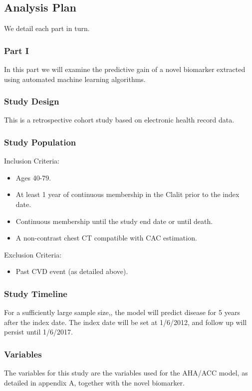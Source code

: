 \documentclass[a4paper,12pt]{article}
\begin{document}
	\subsection{Analysis Plan}
	We detail each part in turn.
	
		\subsubsection{Part I}
		In this part we will examine the predictive gain of a novel biomarker extracted using automated machine learning algorithms.
		
		\subsubsection*{Study Design}
		This is a retrospective cohort study based on electronic health record data.
		
		\subsubsection*{Study Population}
		Inclusion Criteria:
		\begin{itemize}
			\item Ages 40-79.
			\item At least 1 year of continuous membership in the Clalit prior to the index date.
			\item Continuous membership until the study end date or until death.
			\item A non-contrast chest CT compatible with CAC estimation.
		\end{itemize}
		
		Exclusion Criteria:
		\begin{itemize}
			\item Past CVD event (as detailed above).
		\end{itemize}
		
		\subsubsection*{Study Timeline}
		For a sufficiently large sample size,, the model will predict disease for 5 years after the index date. The index date will be set at 1/6/2012, and follow up will persist until 1/6/2017.
		
		\subsubsection*{Variables}
		The variables for this study are the variables used for the AHA/ACC model, as detailed in appendix A, together with the novel biomarker.
		
\end{document}
